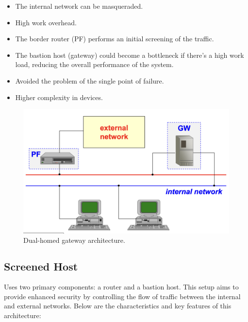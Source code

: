 \begin{multicols}{2}

    \begin{itemize}
        \item The internal network can be masqueraded.
        \item High work overhead.
        \item The border router (PF) performs an initial screening of the traffic.
        \item The bastion host (gateway) could become a bottleneck if there's a high work load, reducing the overall performance of the system.
        \item Avoided the problem of the single point of failure.
        \item Higher complexity in devices.
    \end{itemize}
    

\columnbreak

\begin{figure}[H]
    \centering
    \includegraphics[width=\linewidth]{Images/Firewalling/dual_homed_gateway.png}
    \caption{Dual-homed gateway architecture.}
\end{figure}
\end{multicols}

\subsection{Screened Host}
Uses two primary components: a router and a bastion host. This setup aims to provide enhanced security by controlling the flow of traffic between the internal and external networks. Below are the characteristics and key features of this architecture:

